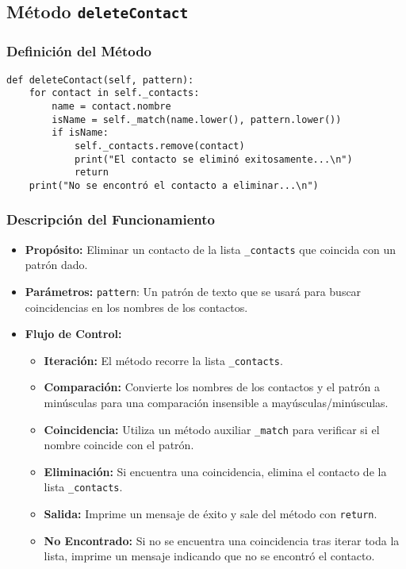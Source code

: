 \subsection{Método \texttt{deleteContact}}
\subsubsection{Definición del Método}

\begin{verbatim}
def deleteContact(self, pattern):
    for contact in self._contacts:
        name = contact.nombre
        isName = self._match(name.lower(), pattern.lower())
        if isName:
            self._contacts.remove(contact)
            print("El contacto se eliminó exitosamente...\n")
            return
    print("No se encontró el contacto a eliminar...\n")
\end{verbatim}

\subsubsection{Descripción del Funcionamiento}
\begin{itemize}
    \item \textbf{Propósito:}
    Eliminar un contacto de la lista \texttt{\_contacts} que coincida con un patrón dado.
    \item \textbf{Parámetros:}
    \texttt{pattern}: Un patrón de texto que se usará para buscar coincidencias en los nombres de los contactos.
    \item \textbf{Flujo de Control:}
    \begin{itemize}
        \item \textbf{Iteración:} El método recorre la lista \texttt{\_contacts}.
        \item \textbf{Comparación:} Convierte los nombres de los contactos y el patrón a minúsculas para una comparación insensible a mayúsculas/minúsculas.
        \item \textbf{Coincidencia:} Utiliza un método auxiliar \texttt{\_match} para verificar si el nombre coincide con el patrón.
        \item \textbf{Eliminación:} Si encuentra una coincidencia, elimina el contacto de la lista \texttt{\_contacts}.
        \item \textbf{Salida:} Imprime un mensaje de éxito y sale del método con \texttt{return}.
        \item \textbf{No Encontrado:} Si no se encuentra una coincidencia tras iterar toda la lista, imprime un mensaje indicando que no se encontró el contacto.
    \end{itemize}
\end{itemize}
